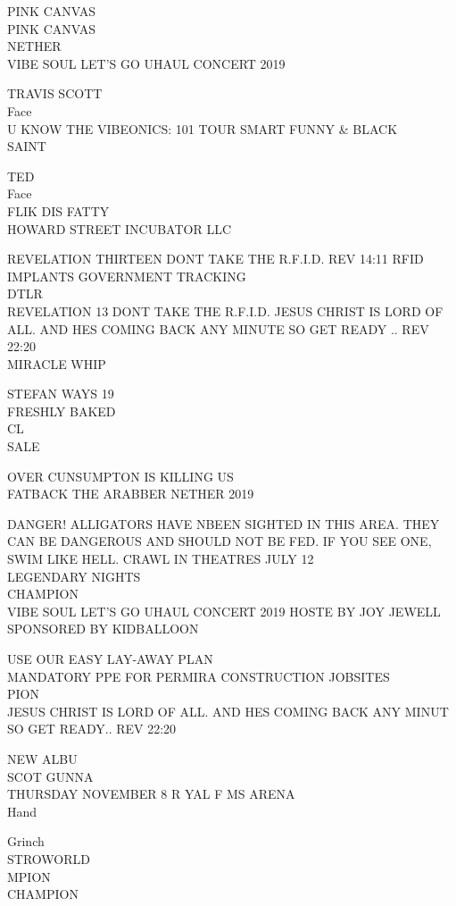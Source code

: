 \documentclass[10pt,letterpaper]{article}
\begin{document}
PINK CANVAS\\
PINK CANVAS\\
NETHER\\
VIBE SOUL LET'S GO UHAUL CONCERT 2019

TRAVIS SCOTT\\
Face\\
U KNOW THE VIBEONICS: 101 TOUR SMART FUNNY \& BLACK\\
SAINT

TED\\
Face\\
FLIK DIS FATTY\\
HOWARD STREET INCUBATOR LLC

REVELATION THIRTEEN DONT TAKE THE R.F.I.D. REV 14:11 RFID IMPLANTS GOVERNMENT TRACKING\\
DTLR\\
REVELATION 13 DONT TAKE THE R.F.I.D. JESUS CHRIST IS LORD OF ALL.  AND HES COMING BACK ANY MINUTE SO GET READY .. REV 22:20\\
MIRACLE WHIP

STEFAN WAYS 19\\
FRESHLY BAKED\\
CL\\
SALE

OVER CUNSUMPTON IS KILLING US\\
FATBACK THE ARABBER NETHER 2019

DANGER! ALLIGATORS HAVE NBEEN SIGHTED IN THIS AREA. THEY CAN BE DANGEROUS AND SHOULD NOT BE FED. IF YOU SEE ONE, SWIM LIKE HELL.  CRAWL IN THEATRES JULY 12\\
LEGENDARY NIGHTS\\
CHAMPION\\
VIBE SOUL LET'S GO UHAUL CONCERT 2019 HOSTE BY JOY JEWELL SPONSORED BY KIDBALLOON

USE OUR EASY LAY{-}AWAY PLAN\\
MANDATORY PPE FOR PERMIRA CONSTRUCTION JOBSITES\\
PION\\
JESUS CHRIST IS LORD OF ALL.  AND HES COMING BACK ANY MINUT SO GET READY.. REV 22:20

NEW ALBU\\
SCOT GUNNA\\
THURSDAY NOVEMBER 8 R YAL F MS ARENA\\
Hand

Grinch\\
STROWORLD\\
MPION\\
CHAMPION
\end{document}

